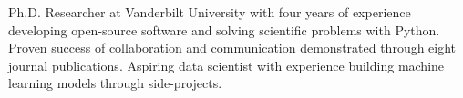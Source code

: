 
\begin{cvparagraph}
    Ph.D. Researcher at Vanderbilt University with four years of experience
    developing open-source software and solving
    scientific problems with Python.  Proven success of collaboration and
    communication demonstrated through eight journal publications.
    Aspiring data
    scientist with experience building machine learning models through
    side-projects.

\end{cvparagraph}
